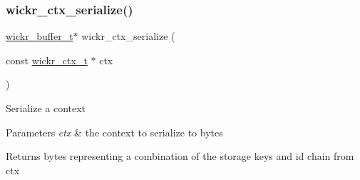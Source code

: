 \subsubsection{\texorpdfstring{wickr\_ctx\_serialize()}{wickr\_ctx\_serialize()}}
{\footnotesize\ttfamily \mbox{\hyperlink{structwickr__buffer}{wickr\+\_\+buffer\+\_\+t}}$\ast$ wickr\+\_\+ctx\+\_\+serialize (\begin{DoxyParamCaption}\item[{const \mbox{\hyperlink{structwickr__ctx}{wickr\+\_\+ctx\+\_\+t}} $\ast$}]{ctx }\end{DoxyParamCaption})}

Serialize a context


\begin{DoxyParams}{Parameters}
{\em ctx} & the context to serialize to bytes \\
\hline
\end{DoxyParams}
\begin{DoxyReturn}{Returns}
bytes representing a combination of the storage keys and id chain from \textquotesingle{}ctx\textquotesingle{} 
\end{DoxyReturn}
